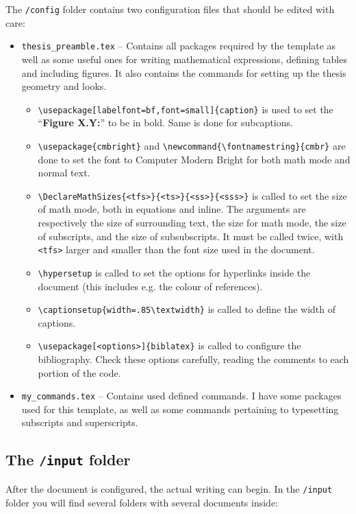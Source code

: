 The \texttt{/config} folder contains two configuration files that should be edited with care:
%
\begin{itemize}
\item \texttt{thesis\_preamble.tex} -- Contains all packages required by the template as well as some useful ones for writing mathematical expressions, defining tables and including figures. It also contains the commands for setting up the thesis geometry and looks.

\begin{itemize}
	\item \Verb*|\usepackage[labelfont=bf,font=small]{caption}| is used to set the ``\textbf{Figure X.Y:}'' to be in bold. Same is done for subcaptions.
	\item \Verb*|\usepackage{cmbright}| and \Verb*|\newcommand{\fontnamestring}{cmbr}| are done to set the font to Computer Modern Bright for both math mode and normal text.
	\item \Verb*|\DeclareMathSizes{<tfs>}{<ts>}{<ss>}{<sss>}| is called to set the size of math mode, both in equations and inline. The arguments are respectively the size of surrounding text, the size for math mode, the size of subscripts, and the size of subsubscripts. It must be called twice, with \verb+<tfs>+ larger and smaller than the font size used in the document.
	\item \Verb*|\hypersetup| is called to set the options for hyperlinks inside the document (this includes e.g. the colour of references).
	\item \Verb*|\captionsetup{width=.85\textwidth}| is called to define the width of captions.
	\item \Verb*|\usepackage[<options>]{biblatex}| is called to configure the bibliography. Check these options carefully, reading the comments to each portion of the code.
\end{itemize}


\item \texttt{my\_commands.tex} -- Contains used defined commands. I have some packages used for this template, as well as some commands pertaining to typesetting subscripts and superscripts.
\end{itemize}

\subsection{The {\normalfont\texttt{/input}} folder} %

After the document is configured, the actual writing can begin. In the \texttt{/input} folder you will find several folders with several documents inside:

